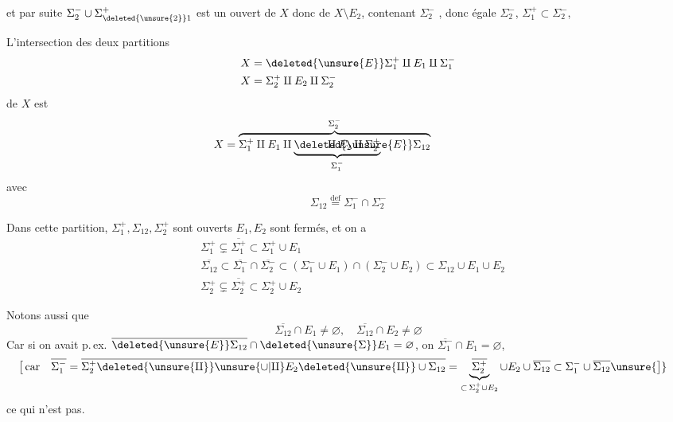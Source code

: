 et par suite $\Sigma_2^-\cup\Sigma_{\deleted{\unsure{2}}1}^+$  est un ouvert  de $X$ donc de $X\setminus E_2$, contenant  $\Sigma_2^-$ , donc  égale  $\Sigma_2^-$,  $\Sigma_1^+\subset\Sigma_2^-$, 

L'intersection des deux partitions
\[
 \begin{aligned}
 X&=\deleted{\unsure{E}}\Sigma_1^+\amalg E_1\amalg\Sigma_1^-\\
 X&=\Sigma_2^+\amalg E_2\amalg\Sigma_2^-
 \end{aligned}
\]
de $X$ est
\[
 X=\overbrace{\Sigma_1^+\amalg E_1\amalg
 \rlap{$\displaystyle\underbrace{\phantom{E^{?}\Sigma_{12}}\amalg
 E_2\amalg\Sigma_2^+}_{\Sigma_1^-}$}\deleted{\unsure{E}}\Sigma_{12}}^{\Sigma_2^-}
 \phantom{\amalg E_2\amalg\Sigma_2^+}
\]
avec
\[
 \Sigma_{12}\overset{\text{def}}{=}\Sigma_1^-\cap\Sigma_2^-
\]

Dans cette partition, $\Sigma_1^+,\Sigma_{12},\Sigma_2^+$ sont ouverts $E_1,E_2$ sont fermés, et on a
\[
 \begin{aligned}
 &\Sigma_1^+\subsetneq\overline{\Sigma_1^+}\subset\Sigma_1^+\cup E_1\\
 &\overline{\Sigma_{12}}\subset\overline{\Sigma_1^-}\cap\overline{\Sigma_2^-}\subset
 (\Sigma_1^-\cup E_1)\cap(\Sigma_2^-\cup E_2)\subset\Sigma_{12}\cup E_1\cup E_2\\
 &\Sigma_2^+\subsetneq\overline{\Sigma_2^+}\subset\Sigma_2^+\cup E_2
 \end{aligned}
\]

Notons aussi que
\[
 \overline{\Sigma_{12}}\cap E_1\ne\varnothing,\quad
 \overline{\Sigma_{12}}\cap E_2\ne\varnothing
\]
Car si on avait p.\,ex. $\overline{\deleted{\unsure{E}}\Sigma_{12}}\cap
\deleted{\unsure{\Sigma}}E_1=\varnothing$, on 
 $\overline{\Sigma_1^-}\cap E_1=\varnothing$,
\[
 \begin{aligned}
 \big[\,\text{car}\quad\overline{\Sigma_1^-}&=
 \overline{\Sigma_2^+\deleted{\unsure{\amalg}}\unsure{\cup|\amalg} E_2
 \deleted{\unsure{\amalg}}\cup\Sigma_{12}}=
 \underbrace{\overline{\Sigma_2^+}}_{\subset\,\Sigma_2^+\cup E_2}\cup E_2
 \cup\overline{\Sigma_{12}}\subset\Sigma_1^-\cup\overline{\Sigma_{12}}\unsure{\big]}
 \end{aligned}
\]
ce qui n'est pas.

